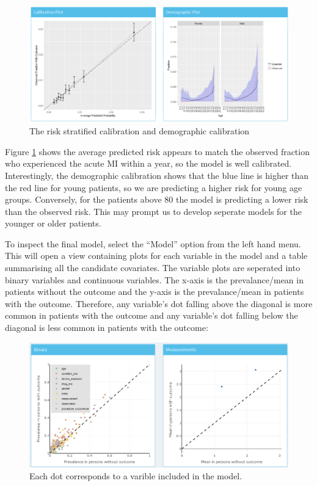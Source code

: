 \documentclass[11pt]{book}
\begin{document}
\begin{figure}

{\centering \includegraphics[width=0.8\linewidth]{images/PatientLevelPrediction/shiny/shinyPerformanceCal} 

}

\caption{The risk stratified calibration and demographic calibration}\label{fig:shinyPerformanceCal}
\end{figure}

Figure \ref{fig:shinyPerformanceCal} shows the average predicted risk
appears to match the observed fraction who experienced the acute MI
within a year, so the model is well calibrated. Interestingly, the
demographic calibration shows that the blue line is higher than the red
line for young patients, so we are predicting a higher risk for young
age groups. Conversely, for the patients above 80 the model is
predicting a lower risk than the observed risk. This may prompt us to
develop seperate models for the younger or older patients.

To inspect the final model, select the ``Model'' option from the left
hand menu. This will open a view containing plots for each variable in
the model and a table summarising all the candidate covariates. The
variable plots are seperated into binary variables and continuous
variables. The x-axis is the prevalance/mean in patients without the
outcome and the y-axis is the prevalance/mean in patients with the
outcome. Therefore, any variable's dot falling above the diagonal is
more common in patients with the outcome and any variable's dot falling
below the diagonal is less common in patients with the outcome:

\begin{figure}

{\centering \includegraphics[width=0.8\linewidth]{images/PatientLevelPrediction/shiny/shinyModelPlots} 

}

\caption{Each dot corresponds to a varible included in the model.}\label{fig:shinyModelPlots}
\end{figure}
\end{document}
